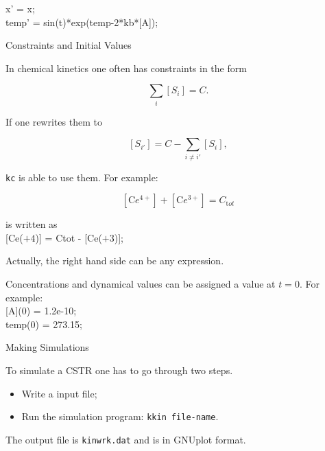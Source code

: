 x' = x;\\
temp' = sin(t)*exp(temp-2*kb*[A]);

\newpage
\begin{center}
Constraints and Initial Values
\end{center}

\vspace{1cm}
In chemical kinetics one often has constraints in the form

\[
  \sum_{i} [S_i] = C.
\]

If one rewrites them to

\[
  [S_{i\prime}] = C - \sum_{i\not =i\prime} [S_i],
\]

{\tt kc} is able to use them. For example:

\[
  [{\mathrm Ce^{4+}}] + [{\mathrm Ce^{3+}}] = C_{\mathrm tot}
\]

is written as \\
{\rm [}Ce($+4$){\rm ]} = Ctot - {\rm [}Ce($+3$){\rm ]};

Actually, the right hand side can be any expression.

\vspace{2cm}
Concentrations and dynamical values can be assigned a value
at $t=0$. For example:\\

[A](0) = 1.2e-10;\\
temp(0) = 273.15;

\newpage
\begin{center}
Making Simulations
\end{center}

\vspace{1cm}
To simulate a CSTR one has to go through two steps.

\begin{itemize}
\item Write a input file;
\item Run the simulation program: {\tt kkin file-name}.
\end{itemize}

The output file is {\tt kinwrk.dat} and is in GNUplot format.

